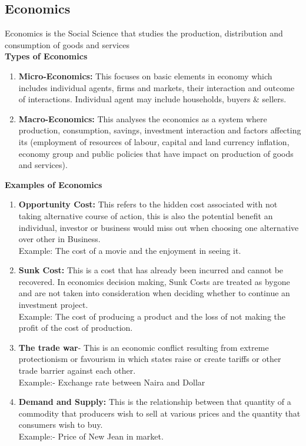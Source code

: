\documentclass{report}
\newcommand{\bt}[1]{\textbf{#1}}
\newcommand{\sps}{\\[0.2cm]}
\newcommand{\NI}{\noindent}
\begin{document}
	\subsection*{Economics}
	Economics is the Social Science that studies the production, distribution and consumption of goods and services\sps
	
	\NI\bt{Types of Economics}
	\begin{enumerate}
		\item \bt{Micro-Economics:} This focuses on basic elements in economy which includes individual agents, firms and markets, their interaction and outcome of interactions. Individual agent may include households, buyers \& sellers.
		\item \bt{Macro-Economics:} This analyses the economics as a system where production, consumption, savings, investment interaction and factors affecting its (employment of resources of labour, capital and land currency inflation, economy group and public policies that have impact on production of goods and services).
	\end{enumerate}
	\newpage
	\NI\bt{Examples of Economics}
	\begin{enumerate}
		\item \bt{Opportunity Cost:} This refers to the hidden cost associated with not taking alternative course of action, this is also the potential benefit an individual, investor or business would miss out when choosing one alternative over other in Business.
		\\Example: The cost of a movie and the enjoyment in seeing it.\\
		
		\item \bt{Sunk Cost:} This is a cost that has already been incurred and cannot be recovered. In economics decision making, Sunk Costs are treated as bygone and are not taken into consideration when deciding whether to continue an investment project.\\
		Example: The cost of producing a product and the loss of not making the profit of the cost of production.\\
		
		\item \bt{The trade war}- This is an economic conflict resulting from extreme protectionism or favourism in which states raise or create tariffs or other trade barrier against each other.\\
		Example:- Exchange rate between Naira and Dollar\\
		
		\item \bt{Demand and Supply:} This is the relationship between that quantity of a commodity that producers wish to sell at various prices and the quantity that consumers wish to buy.\\
		Example:- Price of New Jean in market.
	\end{enumerate}
\end{document}
